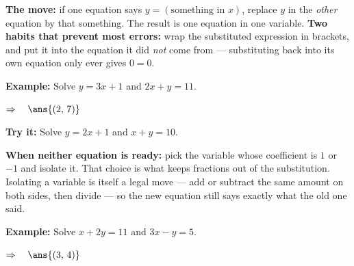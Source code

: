 \documentclass[12pt]{article}
\begin{document}


\begin{formulabox}
\textbf{The move:} if one equation says $y = (\text{something in } x)$, replace $y$ in the
\emph{other} equation by that something. The result is one equation in one variable.
\textbf{Two habits that prevent most errors:} wrap the substituted expression in brackets, and put
it into the equation it did \emph{not} come from --- substituting back into its own equation only
ever gives $0 = 0$.
\end{formulabox}

\begin{examplebox}
\textbf{Example:} \quad Solve $y = 3x + 1$ and $2x + y = 11$.

$\Rightarrow\quad \ans{(2,\,7)}$
\end{examplebox}

\begin{tryitbox}
\textbf{Try it:} \quad Solve $y = 2x + 1$ and $x + y = 10$.\\[2pt]
\end{tryitbox}


\begin{formulabox}
\textbf{When neither equation is ready:} pick the variable whose coefficient is $1$ or $-1$ and
isolate it. That choice is what keeps fractions out of the substitution.
Isolating a variable is itself a legal move --- add or subtract the same amount on both sides, then
divide --- so the new equation still says exactly what the old one said.
\end{formulabox}

\begin{examplebox}
\textbf{Example:} \quad Solve $x + 2y = 11$ and $3x - y = 5$.

$\Rightarrow\quad \ans{(3,\,4)}$
\end{examplebox}
\end{document}

